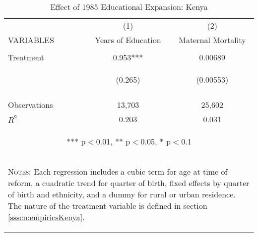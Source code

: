 \begin{subtables}
\begin{table}[htpb!]					
\begin{center}					
\caption{Effect of 1985 Educational Expansion: Kenya}					
\label{MMRtab:Kenya}					
\begin{tabular}{p{3cm}cc}	\toprule				
	&	(1)	&	(2)	\\
VARIABLES	&	Years of Education	&	Maternal Mortality	\\ \midrule
\vspace{4pt}	&	\begin{footnotesize}\end{footnotesize}	&	\begin{footnotesize}\end{footnotesize}	 \\
Treatment	&	0.953***	&	0.00689	\\
	& \begin{footnotesize}	(0.265)	\end{footnotesize} & \begin{footnotesize}	(0.00553)	\end{footnotesize} \\
\vspace{4pt}	&	\begin{footnotesize}\end{footnotesize}	&	\begin{footnotesize}\end{footnotesize}	 \\
Observations	&	13,703	&	25,602	\\
$R^2$	&	0.203	&	0.031	\\ \midrule
\multicolumn{3}{c}{\begin{footnotesize} *** p$<$0.01, ** p$<$0.05, * p$<$0.1\end{footnotesize}} \\					
\multicolumn{3}{p{9.6cm}}{\begin{footnotesize}\textsc{Notes:} Each regression includes a cubic term for age at time of reform, a cuadratic trend for quarter of birth, fixed effects by quarter of birth and ethnicity, and a dummy for rural or urban residence.  The nature of the treatment variable is defined in section \ref{ssscn:empiricsKenya}.\end{footnotesize}} \\					
\bottomrule					
\end{tabular}					
\end{center}					
\end{table}					
\end{subtables}
